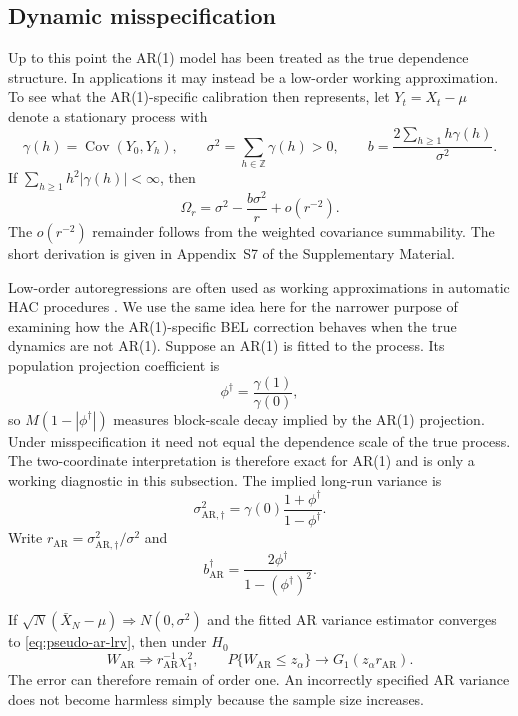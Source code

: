 \documentclass[12pt]{article}
\theoremstyle{remark}
\begin{document}
\subsection{Dynamic misspecification}
\label{sec:dynamic-misspecification}
Up to this point the AR(1) model has been treated as the true dependence structure. In applications it may instead be a low-order working approximation. To see what the AR(1)-specific calibration then represents, let $Y_t=X_t-\mu$ denote a stationary process with
\[
\gamma(h)=\operatorname{Cov}(Y_0,Y_h),
\qquad
\sigma^2=\sum_{h\in\mathbb Z}\gamma(h)>0,
\qquad
b=\frac{2\sum_{h\ge1}h\gamma(h)}{\sigma^2}.
\]
If $\sum_{h\ge1}h^2|\gamma(h)|<\infty$, then
\[
\Omega_r=\sigma^2-\frac{b\sigma^2}{r}+o(r^{-2}).
\]
The $o(r^{-2})$ remainder follows from the weighted covariance summability. The short derivation is given in Appendix~S7 of the Supplementary Material.

Low-order autoregressions are often used as working approximations in automatic HAC procedures \citep{Andrews:1991,Newey.West:1994}. We use the same idea here for the narrower purpose of examining how the AR(1)-specific BEL correction behaves when the true dynamics are not AR(1). Suppose an AR(1) is fitted to the process. Its population projection coefficient is
\[
\phi^\dagger=\frac{\gamma(1)}{\gamma(0)},
\]
so $M(1-|\phi^\dagger|)$ measures block-scale decay implied by the AR(1) projection. Under misspecification it need not equal the dependence scale of the true process. The two-coordinate interpretation is therefore exact for AR(1) and is only a working diagnostic in this subsection. The implied long-run variance is
\begin{equation}
\sigma^2_{\mathrm{AR},\dagger}
=\gamma(0)\frac{1+\phi^\dagger}{1-\phi^\dagger}.
\label{eq:pseudo-ar-lrv}
\end{equation}
Write $r_{\mathrm{AR}}=\sigma^2_{\mathrm{AR},\dagger}/\sigma^2$ and
\[
b_{\mathrm{AR}}^\dagger
=\frac{2\phi^\dagger}{1-(\phi^\dagger)^2}.
\]

If $\sqrt N(\bar X_N-\mu)\Rightarrow N(0,\sigma^2)$ and the fitted AR variance estimator converges to \eqref{eq:pseudo-ar-lrv}, then under $H_0$
\begin{equation}
W_{\mathrm{AR}}\Rightarrow r_{\mathrm{AR}}^{-1}\chi_1^2,
\qquad
P\{W_{\mathrm{AR}}\le z_\alpha\}\longrightarrow G_1(z_\alpha r_{\mathrm{AR}}).
\label{eq:wald-misspecification-limit}
\end{equation}
The error can therefore remain of order one. An incorrectly specified AR variance does not become harmless simply because the sample size increases.
\end{document}
